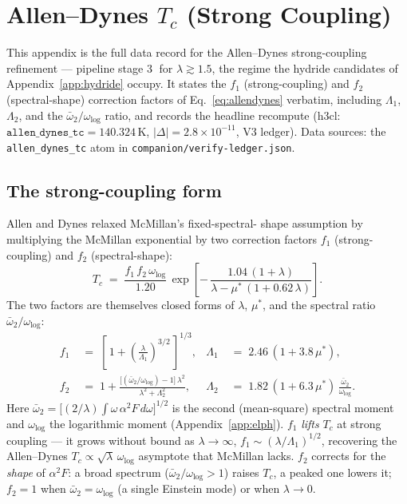 \section{Allen--Dynes $T_c$ (Strong Coupling)}
\label{app:allendynes}

This appendix is the full data record for the Allen--Dynes
\citep{allendynes1975} strong-coupling refinement --- pipeline stage
\textcircled{\scriptsize 3} for $\lambda\!\gtrsim\!1.5$, the regime the
hydride candidates of Appendix~\ref{app:hydride} occupy. It states the
$f_1$ (strong-coupling) and $f_2$ (spectral-shape) correction factors of
Eq.~\eqref{eq:allendynes} verbatim, including $\Lambda_1$, $\Lambda_2$,
and the $\bar\omega_2/\omega_{\log}$ ratio, and records the headline
recompute (h3cl: $\texttt{allen\_dynes\_tc}\!=\!140.324$\,K,
$|\Delta|\!=\!2.8\!\times\!10^{-11}$, V3 ledger). Data sources: the
\texttt{allen\_dynes\_tc} atom in \texttt{companion/verify-ledger.json}.

\subsection{The strong-coupling form}
\label{app:ad-eq}

Allen and Dynes \citep{allendynes1975} relaxed McMillan's fixed-spectral-
shape assumption by multiplying the McMillan exponential by two correction
factors $f_1$ (strong-coupling) and $f_2$ (spectral-shape):
\begin{equation}
T_c \;=\; \frac{f_1\,f_2\,\omega_{\log}}{1.20}\,
  \exp\!\left[-\,\frac{1.04\,(1+\lambda)}
                     {\lambda - \mu^{*}\,(1+0.62\,\lambda)}\right].
\label{eq:ad-app}
\end{equation}
The two factors are themselves closed forms of $\lambda$, $\mu^{*}$, and
the spectral ratio $\bar\omega_2/\omega_{\log}$:
\begin{align}
f_1 &\;=\; \left[\,1 + \left(\frac{\lambda}{\Lambda_1}\right)^{3/2}\,\right]^{1/3},
   & \Lambda_1 &\;=\; 2.46\,(1 + 3.8\,\mu^{*}),
   \label{eq:f1}\\[4pt]
f_2 &\;=\; 1 + \frac
   {\big[(\bar\omega_2/\omega_{\log}) - 1\big]\,\lambda^2}
   {\lambda^2 + \Lambda_2^2},
   & \Lambda_2 &\;=\; 1.82\,(1 + 6.3\,\mu^{*})\,\frac{\bar\omega_2}{\omega_{\log}}.
   \label{eq:f2}
\end{align}
Here $\bar\omega_2=\big[(2/\lambda)\!\int\!\omega\,\alpha^2F\,d\omega\big]^{1/2}$
is the second (mean-square) spectral moment and $\omega_{\log}$ the
logarithmic moment (Appendix~\ref{app:elph}). $f_1$ \emph{lifts} $T_c$ at
strong coupling --- it grows without bound as $\lambda\!\to\!\infty$,
$f_1\!\sim\!(\lambda/\Lambda_1)^{1/2}$, recovering the
Allen--Dynes $T_c\!\propto\!\sqrt{\lambda}\,\omega_{\log}$ asymptote that
McMillan lacks. $f_2$ corrects for the \emph{shape} of $\alpha^2F$: a
broad spectrum ($\bar\omega_2/\omega_{\log}\!>\!1$) raises $T_c$, a peaked
one lowers it; $f_2\!=\!1$ when $\bar\omega_2=\omega_{\log}$ (a single
Einstein mode) or when $\lambda\!\to\!0$.

